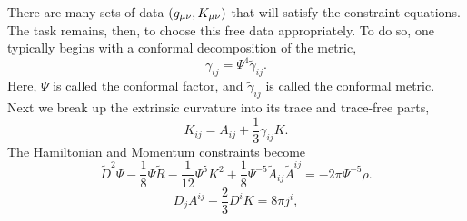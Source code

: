 There are many sets of data $(g_{\mu\nu},K_{\mu\nu})$ that will satisfy the constraint equations. The task remains, then, to choose this free data appropriately. To do so, one typically begins with a conformal decomposition of the metric,
\begin{equation}
\gamma_{ij}=\Psi^4\tilde{\gamma}_{ij}.
\end{equation}
Here, $\Psi$ is called the conformal factor, and $\tilde{\gamma}_{ij}$ is called the conformal metric. Next we break up the extrinsic curvature into its trace and trace-free parts,
\begin{equation}
K_{ij}=A_{ij}+\frac{1}{3}\gamma_{ij}K.
\end{equation}
The Hamiltonian and Momentum constraints become
\begin{equation}
\tilde{D}^2\Psi-\frac{1}{8}\Psi\tilde{R}-\frac{1}{12}\Psi^5K^2+\frac{1}{8}\Psi^{-5}\tilde{A}_{ij}\tilde{A}^{ij}=-2\pi\Psi^{-5}{\rho}.
\end{equation}
\begin{equation}
{D}_j{A}^{ij}-\frac{2}{3}{D}^iK=8\pi j^i,
\end{equation}

